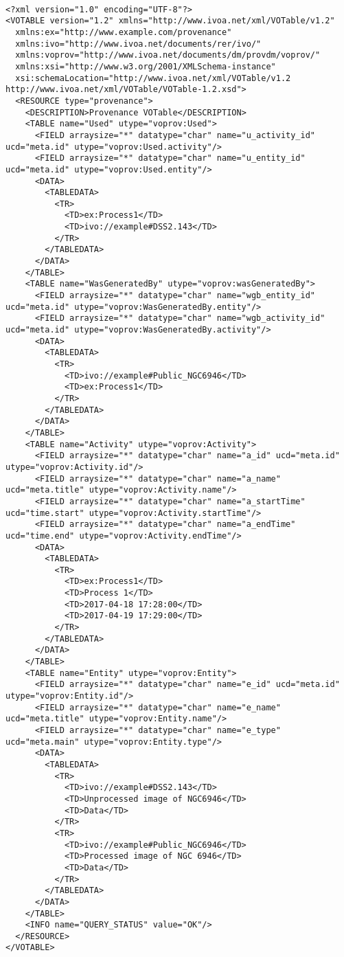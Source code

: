 \begin{verbatim}

<?xml version="1.0" encoding="UTF-8"?>
<VOTABLE version="1.2" xmlns="http://www.ivoa.net/xml/VOTable/v1.2" 
  xmlns:ex="http://www.example.com/provenance" 
  xmlns:ivo="http://www.ivoa.net/documents/rer/ivo/"
  xmlns:voprov="http://www.ivoa.net/documents/dm/provdm/voprov/" 
  xmlns:xsi="http://www.w3.org/2001/XMLSchema-instance" 
  xsi:schemaLocation="http://www.ivoa.net/xml/VOTable/v1.2 http://www.ivoa.net/xml/VOTable/VOTable-1.2.xsd">
  <RESOURCE type="provenance">
    <DESCRIPTION>Provenance VOTable</DESCRIPTION>
    <TABLE name="Used" utype="voprov:Used">
      <FIELD arraysize="*" datatype="char" name="u_activity_id" ucd="meta.id" utype="voprov:Used.activity"/>
      <FIELD arraysize="*" datatype="char" name="u_entity_id" ucd="meta.id" utype="voprov:Used.entity"/>
      <DATA>
        <TABLEDATA>
          <TR>
            <TD>ex:Process1</TD>
            <TD>ivo://example#DSS2.143</TD>
          </TR>
        </TABLEDATA>
      </DATA>
    </TABLE>
    <TABLE name="WasGeneratedBy" utype="voprov:wasGeneratedBy">
      <FIELD arraysize="*" datatype="char" name="wgb_entity_id" ucd="meta.id" utype="voprov:WasGeneratedBy.entity"/>
      <FIELD arraysize="*" datatype="char" name="wgb_activity_id" ucd="meta.id" utype="voprov:WasGeneratedBy.activity"/>
      <DATA>
        <TABLEDATA>
          <TR>
            <TD>ivo://example#Public_NGC6946</TD>
            <TD>ex:Process1</TD>
          </TR>
        </TABLEDATA>
      </DATA>
    </TABLE>
    <TABLE name="Activity" utype="voprov:Activity">
      <FIELD arraysize="*" datatype="char" name="a_id" ucd="meta.id" utype="voprov:Activity.id"/>
      <FIELD arraysize="*" datatype="char" name="a_name" ucd="meta.title" utype="voprov:Activity.name"/>
      <FIELD arraysize="*" datatype="char" name="a_startTime" ucd="time.start" utype="voprov:Activity.startTime"/>
      <FIELD arraysize="*" datatype="char" name="a_endTime" ucd="time.end" utype="voprov:Activity.endTime"/>
      <DATA>
        <TABLEDATA>
          <TR>
            <TD>ex:Process1</TD>
            <TD>Process 1</TD>
            <TD>2017-04-18 17:28:00</TD>
            <TD>2017-04-19 17:29:00</TD>
          </TR>
        </TABLEDATA>
      </DATA>
    </TABLE>
    <TABLE name="Entity" utype="voprov:Entity">
      <FIELD arraysize="*" datatype="char" name="e_id" ucd="meta.id" utype="voprov:Entity.id"/>
      <FIELD arraysize="*" datatype="char" name="e_name" ucd="meta.title" utype="voprov:Entity.name"/>
      <FIELD arraysize="*" datatype="char" name="e_type" ucd="meta.main" utype="voprov:Entity.type"/>
      <DATA>
        <TABLEDATA>
          <TR>
            <TD>ivo://example#DSS2.143</TD>
            <TD>Unprocessed image of NGC6946</TD>
            <TD>Data</TD>
          </TR>
          <TR>
            <TD>ivo://example#Public_NGC6946</TD>
            <TD>Processed image of NGC 6946</TD>
            <TD>Data</TD>
          </TR>
        </TABLEDATA>
      </DATA>
    </TABLE>
    <INFO name="QUERY_STATUS" value="OK"/>
  </RESOURCE>
</VOTABLE>
\end{verbatim}



